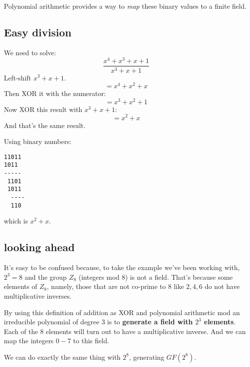 \documentclass[11pt, oneside]{article}
\begin{document}
Polynomial arithmetic provides a way to \emph{map} these binary values to a finite field.

\subsection*{Easy division}
We need to solve:
\[ \frac{x^4 + x^3 + x  + 1}{x^3 +x+1} \]
Left-shift $x^3 +x+1$.
\[ = x^4 + x^2 + x \]
Then XOR it with the numerator:
\[ = x^3 + x^2 + 1 \]
Now XOR this result with $x^3 +x+1$:
\[ = x^2 + x \]
And that's the same result.

Using binary numbers:

\begin{verbatim}
11011
1011
-----
 1101
 1011
  ----
  110
\end{verbatim}
  
which is $x^2 + x$.

\subsection*{looking ahead}

It's easy to be confused because, to take the example we've been working with, $2^3 = 8$ and the group $Z_8$ (integers mod 8) is not a field.  That's because some elements of $Z_8$, namely, those that are not co-prime to $8$ like $2, 4, 6$ do not have multiplicative inverses.

By using this definition of addition as XOR and polynomial arithmetic mod an irreducible polynomial of degree 3 is to \textbf{generate a field with $2^3$ elements}.  Each of the 8 elements will turn out to have a multiplicative inverse.  And we can map the integers $0-7$ to this field.

We can do exactly the same thing with $2^8$, generating $GF(2^8)$.
\end{document}
